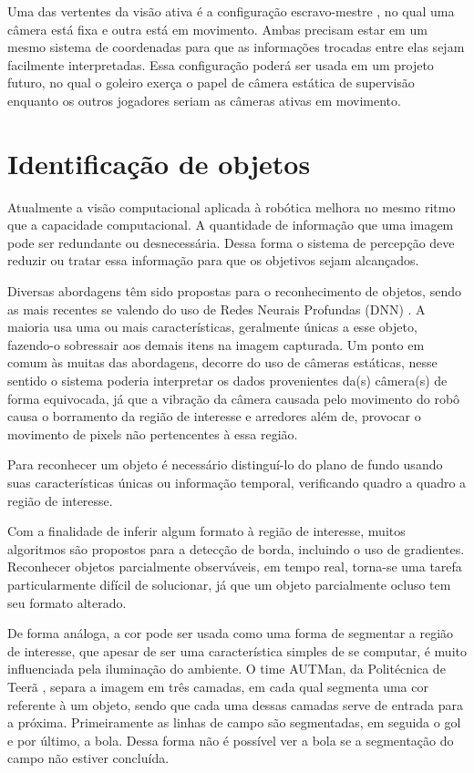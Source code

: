 Uma das vertentes da visão ativa é a configuração escravo-mestre \cite[p.2]{Fernandez}, no qual uma câmera está fixa e outra está em movimento. Ambas precisam estar em um mesmo sistema de coordenadas para que as informações trocadas entre elas sejam facilmente interpretadas. Essa configuração poderá ser usada em um projeto futuro, no qual o goleiro exerça o papel de câmera estática de supervisão enquanto os outros jogadores seriam as câmeras ativas em movimento. 

\section{Identificação de objetos}

Atualmente a visão computacional aplicada à robótica melhora no mesmo ritmo que a capacidade computacional. A quantidade de informação que uma imagem pode ser redundante ou desnecessária. Dessa forma o sistema de percepção deve reduzir ou tratar essa informação para que os objetivos sejam alcançados. 

Diversas abordagens têm sido propostas para o reconhecimento de objetos, sendo as mais recentes se valendo do uso de Redes Neurais Profundas (DNN) \cite{Deep1} \cite{Deep2} \cite{mccannobject}. A maioria usa uma ou mais características, geralmente únicas a esse objeto, fazendo-o sobressair aos demais itens na imagem capturada. Um ponto em comum às muitas das abordagens, decorre do uso de câmeras estáticas, nesse sentido o sistema poderia interpretar os dados provenientes da(s) câmera(s) de forma equivocada, já que a vibração da câmera causada pelo movimento do robô causa o borramento da região de interesse e arredores além de, provocar o movimento de pixels não pertencentes à essa região. 

Para reconhecer um objeto é necessário distinguí-lo do plano de fundo usando suas características únicas ou informação temporal, verificando quadro a quadro a região de interesse.

Com a finalidade de inferir algum formato à região de interesse, muitos algoritmos são propostos para a detecção de borda, incluindo o uso de gradientes. Reconhecer objetos parcialmente observáveis, em tempo real, torna-se uma tarefa particularmente difícil de  solucionar, já que um objeto parcialmente ocluso tem seu formato alterado. 

De forma análoga, a cor pode ser usada como uma forma de segmentar a região de interesse, que apesar de ser uma característica simples de se computar, é muito influenciada pela iluminação do ambiente. O time AUTMan, da Politécnica de Teerã \cite{AUTMan}, separa a imagem em três camadas, em cada qual segmenta uma cor referente à um objeto, sendo que cada uma dessas camadas serve de entrada para a próxima. Primeiramente as linhas de campo são segmentadas, em seguida o gol e por último, a bola. Dessa forma não é possível ver a bola se a segmentação do campo não estiver concluída. 

